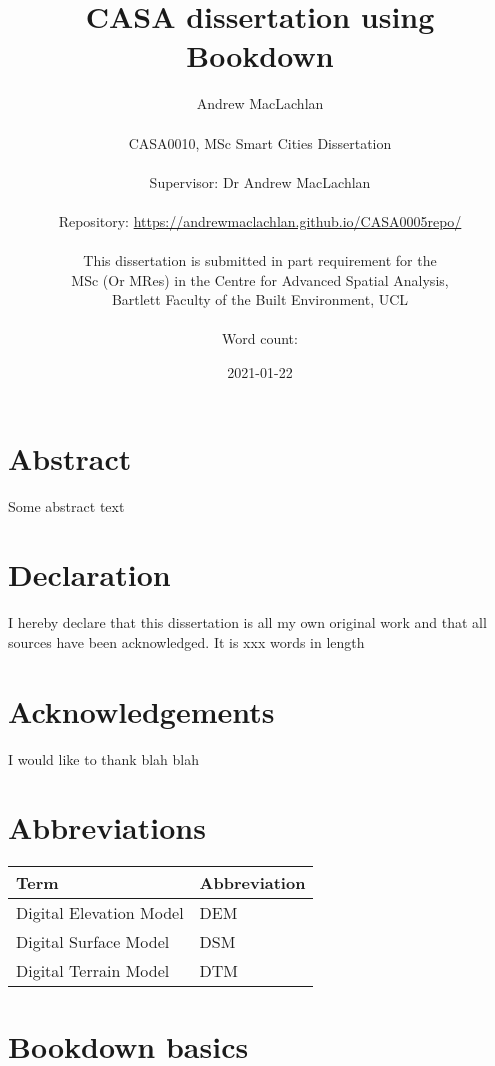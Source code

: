 \documentclass[
  12pt,
  oneside]{book}
\title{CASA dissertation using Bookdown}
\author{Andrew MacLachlan\\
~\\
CASA0010, MSc Smart Cities Dissertation\\
~\\
Supervisor: Dr Andrew MacLachlan\\
~\\
Repository: \url{https://andrewmaclachlan.github.io/CASA0005repo/}\\
~\\
This dissertation is submitted in part requirement for the\\
MSc (Or MRes) in the Centre for Advanced Spatial Analysis,\\
Bartlett Faculty of the Built Environment, UCL\\
~\\
Word count:}
\date{2021-01-22}
\begin{document}
\maketitle


\hypertarget{abstract}{%
\chapter*{Abstract}\label{abstract}}

Some abstract text


\hypertarget{declaration}{%
\chapter*{Declaration}\label{declaration}}

I hereby declare that this dissertation is all my own original work and that all sources have been acknowledged. It is xxx words in length

\hypertarget{acknowledgements}{%
\chapter*{Acknowledgements}\label{acknowledgements}}

I would like to thank blah blah

\setcounter{tocdepth}{3}
\tableofcontents
\listoffigures
\listoftables

\hypertarget{abbreviations}{%
\chapter*{Abbreviations}\label{abbreviations}}

\begin{table}[H]
\centering
\begin{tabular}{ll}
\toprule
\textbf{Term} & \textbf{Abbreviation}\\
\midrule
Digital Elevation Model & DEM\\
Digital Surface Model & DSM\\
Digital Terrain Model & DTM\\
\bottomrule
\end{tabular}
\end{table}

\hypertarget{bookdown-basics}{%
\chapter{Bookdown basics}\label{bookdown-basics}}
\end{document}
